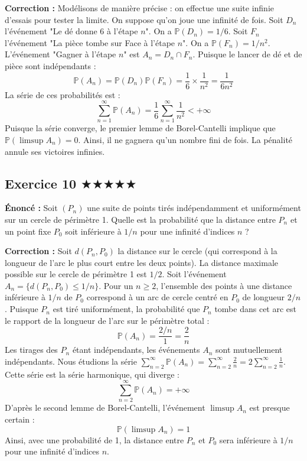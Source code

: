 \documentclass[11pt,a4paper]{article}
\begin{document}
\textbf{Correction :}
Modélisons de manière précise : on effectue une suite infinie d'essais pour tester la limite. On suppose qu'on joue une infinité de fois.
Soit $D_n$ l'événement "Le dé donne 6 à l'étape $n$". On a $\mathbb{P}(D_n) = 1/6$.
Soit $F_n$ l'événement "La pièce tombe sur Face à l'étape $n$". On a $\mathbb{P}(F_n) = 1/n^2$.
L'événement "Gagner à l'étape $n$" est $A_n = D_n \cap F_n$.
Puisque le lancer de dé et de pièce sont indépendants :
$$ \mathbb{P}(A_n) = \mathbb{P}(D_n) \mathbb{P}(F_n) = \frac{1}{6} \times \frac{1}{n^2} = \frac{1}{6n^2} $$
La série de ces probabilités est :
$$ \sum_{n=1}^\infty \mathbb{P}(A_n) = \frac{1}{6} \sum_{n=1}^\infty \frac{1}{n^2} < +\infty $$
Puisque la série converge, le premier lemme de Borel-Cantelli implique que $\mathbb{P}(\limsup A_n) = 0$.
Ainsi, il ne gagnera qu'un nombre fini de fois. La pénalité annule ses victoires infinies.


\subsection*{Exercice 10 \quad $\bigstar\bigstar\bigstar\bigstar\bigstar$}


\textbf{Énoncé :}
Soit $(P_n)$ une suite de points tirés indépendamment et uniformément sur un cercle de périmètre 1.
Quelle est la probabilité que la distance entre $P_n$ et un point fixe $P_0$ soit inférieure à $1/n$ pour une infinité d'indices $n$ ?

\textbf{Correction :}
Soit $d(P_n, P_0)$ la distance sur le cercle (qui correspond à la longueur de l'arc le plus court entre les deux points).
La distance maximale possible sur le cercle de périmètre 1 est $1/2$.
Soit l'événement $A_n = \{ d(P_n, P_0) \le 1/n \}$.
Pour un $n \ge 2$, l'ensemble des points à une distance inférieure à $1/n$ de $P_0$ correspond à un arc de cercle centré en $P_0$ de longueur $2/n$.
Puisque $P_n$ est tiré uniformément, la probabilité que $P_n$ tombe dans cet arc est le rapport de la longueur de l'arc sur le périmètre total :
$$ \mathbb{P}(A_n) = \frac{2/n}{1} = \frac{2}{n} $$
Les tirages des $P_n$ étant indépendants, les événements $A_n$ sont mutuellement indépendants.
Nous étudions la série $\sum_{n=2}^\infty \mathbb{P}(A_n) = \sum_{n=2}^\infty \frac{2}{n} = 2 \sum_{n=2}^\infty \frac{1}{n}$.
Cette série est la série harmonique, qui diverge :
$$ \sum_{n=2}^\infty \mathbb{P}(A_n) = +\infty $$
D'après le second lemme de Borel-Cantelli, l'événement $\limsup A_n$ est presque certain :
$$ \mathbb{P}(\limsup A_n) = 1 $$
Ainsi, avec une probabilité de 1, la distance entre $P_n$ et $P_0$ sera inférieure à $1/n$ pour une infinité d'indices $n$.
\end{document}

